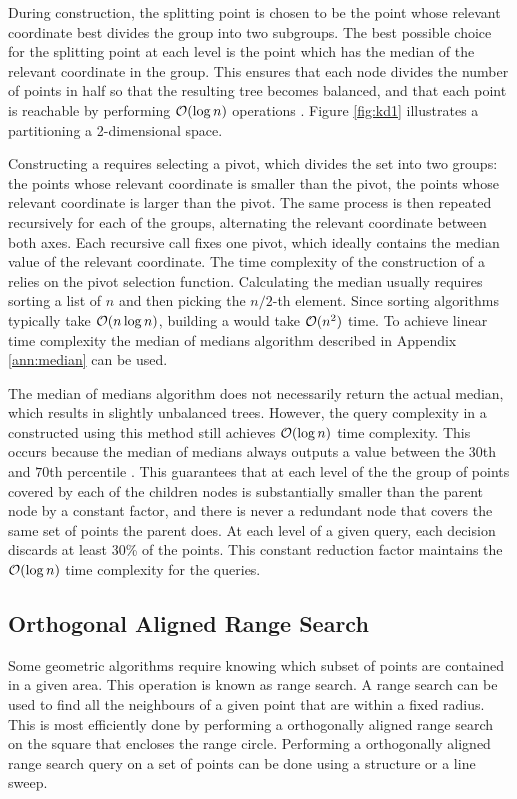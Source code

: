 During construction, the splitting point is chosen to be the point whose relevant coordinate best divides the group into two subgroups. The best possible choice for the splitting point at each level is the point which has the median of the relevant coordinate in the group. This ensures that each node divides the number of points in half so that the resulting tree becomes balanced, and that each point is reachable by performing $\mathcal{O}(\log{n})$ operations \cite{kdtrees}. Figure \ref{fig:kd1} illustrates a \kdtree partitioning a 2-dimensional space.



Constructing a \kdtree requires selecting a pivot, which divides the set into two groups: the points whose relevant coordinate is smaller than the pivot, the points whose relevant coordinate is larger than the pivot. The same process is then repeated recursively for each of the groups, alternating the relevant coordinate between both axes. Each recursive call fixes one pivot, which ideally contains the median value of the relevant coordinate. The time complexity of the construction of a \kdtree relies on the pivot selection function. Calculating the median usually requires sorting a list of $n$ and then picking the $n/2$-th element. Since sorting algorithms typically take $\mathcal{O}(n \log{n})$, building a \kdtree would take $\mathcal{O}(n^2)$ time. To achieve linear time complexity the median of medians algorithm described in Appendix \ref{ann:median} can be used.

The median of medians algorithm does not necessarily return the actual median, which results in slightly unbalanced trees. However, the query complexity in a \kdtree constructed using this method still achieves $\mathcal{O}(\log{n})$ time complexity. This occurs because the median of medians always outputs a value between the $30$th and $70$th percentile \cite{mediancomplex}. This guarantees that at each level of the \kdtree the group of points covered by each of the children nodes is substantially smaller than the parent node by a constant factor, and there is never a redundant node that covers the same set of points the parent does. At each level of a given query, each decision discards at least 30\% of the points. This constant reduction factor maintains the $\mathcal{O}(\log{n})$ time complexity for the queries. 

\subsection{Orthogonal Aligned Range Search}
Some geometric algorithms require knowing which subset of points are contained in a given area. This operation is known as range search. A range search can be used to find all the neighbours of a given point that are within a fixed radius. This is most efficiently done by performing a orthogonally aligned range search on the square that encloses the range circle. Performing a orthogonally aligned range search query on a set of points can be done using a \kdtree structure or a line sweep.

